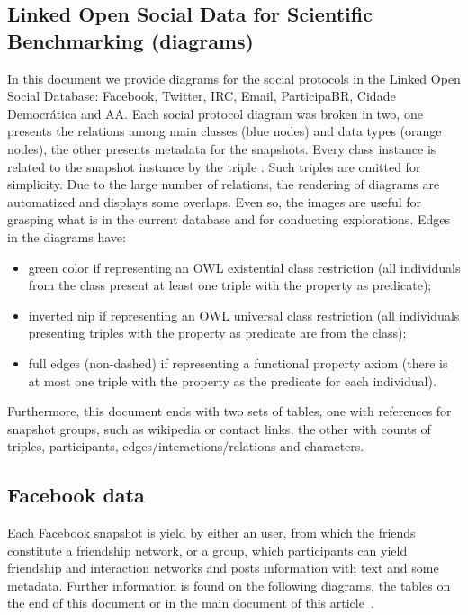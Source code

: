 
\begin{apendicesenv}
	\partapendices
	\chapter{Linked Open Social Data for Scientific Benchmarking (diagrams)}\label{ap:losd}

	In this document we provide diagrams
	for the social protocols in the Linked Open Social Database:
	Facebook, Twitter, IRC, Email, ParticipaBR, Cidade Democrática and AA.
	Each social protocol diagram was broken in two, one presents the relations
	among main classes (blue nodes) and data types (orange nodes),
	the other presents metadata for the
	snapshots.
	Every class instance is related to the snapshot instance
	by the triple .
	Such triples are omitted for simplicity.
	Due to the large number of relations, the rendering of diagrams are
	automatized and displays some overlaps.
	Even so, the images are useful for grasping what is in the current
	database and for conducting explorations.
	Edges in the diagrams have:
	\begin{itemize}
		\item green color if representing an OWL existential
			class restriction (all individuals from the class present at least one triple with
				    the property as predicate);
			    \item inverted nip if representing an OWL universal class
				    restriction (all individuals presenting triples with the
								property as predicate are from the class);
							\item full edges (non-dashed) if representing a functional property
								axiom (there is at most one triple with the property as the
											    predicate for each individual).
	\end{itemize}

	Furthermore, this document ends with two sets of tables, one with
	references for snapshot groups, such as wikipedia or
	contact links, 
	the other with 
	counts of
	triples, participants, edges/interactions/relations and characters.


	\section{Facebook data}
	Each Facebook snapshot is yield by either an user, from which the
	friends constitute a friendship network, or a group, which participants
	can yield friendship and interaction networks and posts information with
	text and some metadata.
	Further information is found on the following diagrams, the tables on
	the end of this document or in the main document of this
	article~\cite{losd}.


\end{apendicesenv}
